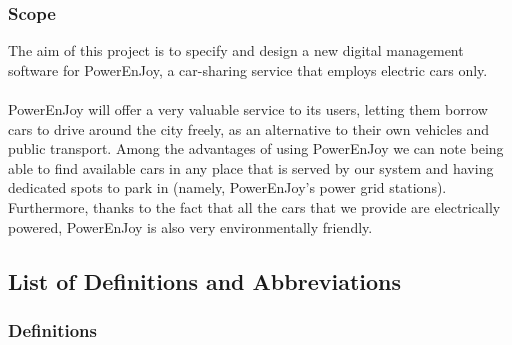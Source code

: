 \documentclass[english]{article}
\begin{document}
\subsubsection{Scope}
The aim of this project is to specify and design a new digital management software for PowerEnJoy, a car-sharing service that employs electric cars only.

\paragraph{}
PowerEnJoy will offer a very valuable service to its users, letting them borrow cars to drive around the city freely, as an alternative to their own vehicles and public transport.
Among the advantages of using PowerEnJoy we can note being able to find available cars in any place that is served by our system and having dedicated spots to park in (namely, PowerEnJoy's power grid stations).
Furthermore, thanks to the fact that all the cars that we provide are electrically powered, PowerEnJoy is also very environmentally friendly.

%

\newpage
\subsection{List of Definitions and Abbreviations}

\subsubsection{Definitions}
\end{document}
